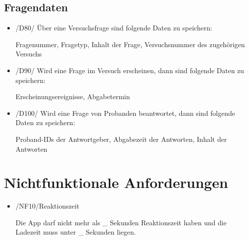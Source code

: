 \documentclass[a4paper]{scrreprt}
\begin{document}
        \section{Fragendaten}
            \begin{itemize}
                \item /D80/ Über eine Versuchsfrage sind folgende Daten zu speichern:
                    \par Fragenummer, Fragetyp, Inhalt der Frage, Versuchsnummer des zugehörigen Versuchs

                \item /D90/ Wird eine Frage im Versuch erscheinen, dann sind folgende Daten zu speichern:
                    \par Erscheinungsereignisse, Abgabetermin

                \item /D100/ Wird eine Frage von Probanden beantwortet, dann sind folgende Daten zu speichern:
                    \par Proband-IDs der Antwortgeber, Abgabezeit der Antworten, Inhalt der Antworten
            \end{itemize}

   \chapter{Nichtfunktionale Anforderungen}
        \begin{itemize}
            \item /NF10/Reaktionszeit

            	\par Die App darf nicht mehr als \_ Sekunden Reaktionszeit haben und die Ladezeit muss unter \_ Sekunden liegen.


        \end{itemize}
\end{document}
